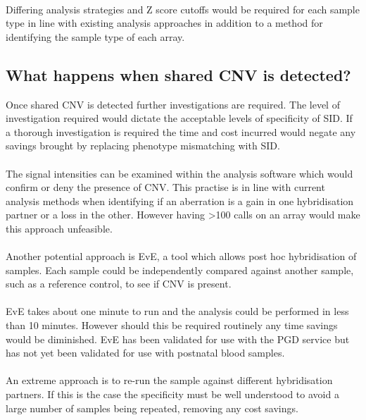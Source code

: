 \paragraph*{}
Differing analysis strategies and Z score cutoffs would be required for each sample type in line with existing analysis approaches in addition to a method for identifying the sample type of each array.
\subsection{What happens when shared CNV is detected?}
Once shared CNV is detected further investigations are required. The level of investigation required would dictate the acceptable levels of specificity of SID. If a thorough investigation is required the time and cost incurred would negate any savings brought by replacing phenotype mismatching with SID.
\paragraph*{}
The signal intensities can be examined within the analysis software which would confirm or deny the presence of CNV. This practise is in line with current analysis methods when identifying if an aberration is a gain in one hybridisation partner or a loss in the other. However having \textgreater 100 calls on an array would make this approach unfeasible.
\paragraph*{}
Another potential approach is EvE, a tool which allows post hoc hybridisation of samples. Each sample could be independently compared against another sample, such as a reference control, to see if CNV is present. 
\paragraph*{}
EvE takes about one minute to run and the analysis could be performed in less than 10 minutes. However should this be required routinely any time savings would be diminished.
EvE has been validated for use with the PGD service but has not yet been validated for use with postnatal blood samples.
\paragraph*{}
An extreme approach is to re-run the sample against different hybridisation partners. If this is the case the specificity must be well understood to avoid a large number of samples being repeated, removing any cost savings.
